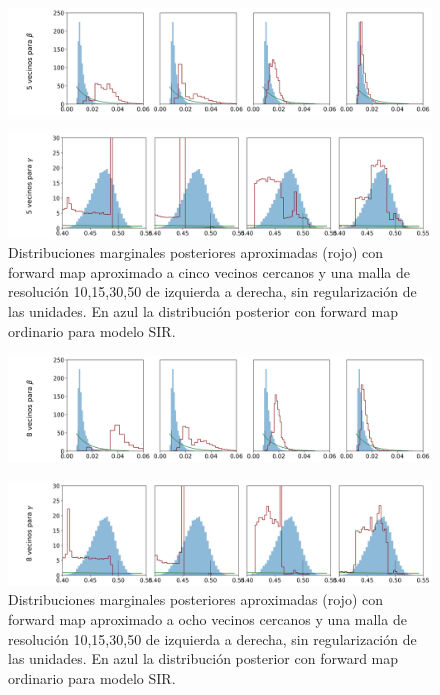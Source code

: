 \begin{figure}[H] 
    \centering 
    \includegraphics[width = 17 cm ]{img/Unidades_1.png} 
\end{figure} 
\begin{figure}[H] 
    \centering 
    \includegraphics[width = 17 cm ]{img/Unidades_2} 
    \caption{Distribuciones marginales posteriores aproximadas (rojo) con forward map aproximado a cinco vecinos cercanos y una malla de resolución 10,15,30,50 de izquierda a derecha, sin regularización de las unidades. En azul la distribución posterior con forward map ordinario para modelo SIR.}
    \label{Fig. Regulacion_1}
\end{figure} 

\begin{figure}[H] 
    \centering 
    \includegraphics[width = 17 cm ]{img/Unidades_3.png} 
\end{figure} 
\begin{figure}[H] 
    \centering 
    \includegraphics[width = 17 cm ]{img/Unidades_4} 
    \caption{Distribuciones marginales posteriores aproximadas (rojo) con forward map aproximado a ocho vecinos cercanos y una malla de resolución 10,15,30,50 de izquierda a derecha, sin regularización de las unidades. En azul la distribución posterior con forward map ordinario para modelo SIR.}
    \label{Fig. Regulacion_2}
\end{figure} 

